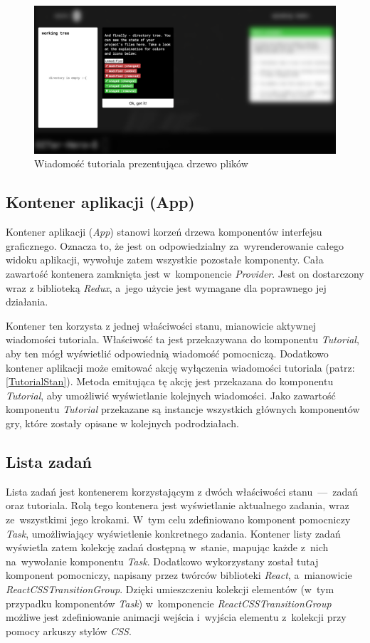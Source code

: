 \documentclass[12pt,a4paper,polish,thesis]{dcsbook}
\begin{document}
{	\begin{figure}[h]
		\centering
		\includegraphics[width=15cm]{component-tutorial}
		\caption{Wiadomość tutoriala prezentująca drzewo plików}
		\label{fig:tutorial}
	\end{figure}
	\FloatBarrier

	\subsection{Kontener aplikacji (App)}

	Kontener aplikacji (\textit{App}) stanowi korzeń drzewa komponentów interfejsu graficznego. Oznacza to, że jest on odpowiedzialny za~wyrenderowanie całego widoku aplikacji, wywołuje zatem wszystkie pozostałe komponenty. Cała zawartość kontenera zamknięta jest w~komponencie \textit{Provider}. Jest on dostarczony wraz z biblioteką \textit{Redux}, a~jego użycie jest wymagane dla poprawnego jej działania.

	Kontener ten korzysta z jednej właściwości stanu, mianowicie aktywnej wiadomości tutoriala. Właściwość ta jest przekazywana do komponentu \textit{Tutorial}, aby ten mógł wyświetlić odpowiednią wiadomość pomocniczą. Dodatkowo kontener aplikacji może emitować akcję wyłączenia wiadomości tutoriala (patrz: \ref{TutorialStan}). Metoda emitująca tę akcję jest przekazana do komponentu \textit{Tutorial}, aby umożliwić wyświetlanie kolejnych wiadomości. Jako zawartość komponentu \textit{Tutorial} przekazane są instancje wszystkich głównych komponentów gry, które zostały opisane w kolejnych podrodziałach.

	\subsection{Lista zadań}

	Lista zadań jest kontenerem korzystającym z dwóch właściwości stanu~---~zadań oraz tutoriala. Rolą tego kontenera jest wyświetlanie aktualnego zadania, wraz ze~wszystkimi jego krokami. W~tym celu zdefiniowano komponent pomocniczy \textit{Task}, umożliwiający wyświetlenie konkretnego zadania. Kontener listy zadań wyświetla zatem kolekcję zadań dostępną w~stanie, mapując każde z~nich na~wywołanie komponentu \textit{Task}. Dodatkowo wykorzystany został tutaj komponent pomocniczy, napisany przez twórców biblioteki \textit{React}, a~mianowicie \textit{ReactCSSTransitionGroup}. Dzięki umieszczeniu kolekcji elementów (w~tym przypadku komponentów \textit{Task}) w~komponencie \textit{ReactCSSTransitionGroup} możliwe jest zdefiniowanie animacji wejścia i~wyjścia elementu z~kolekcji przy pomocy arkuszy stylów \textit{CSS}.

}
\end{document}
